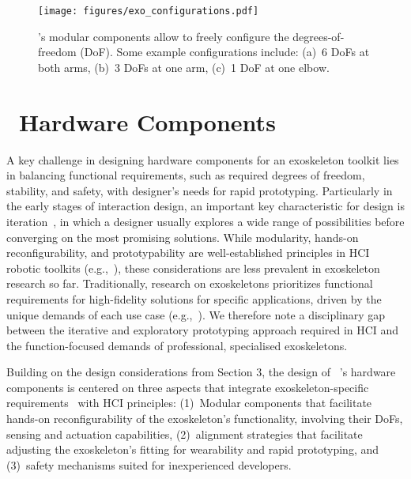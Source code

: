 \begin{figure*}[t]
    \centering
    \texttt{[image: figures/exo\_configurations.pdf]}
    \caption{\toolkit's modular components allow to freely configure the degrees-of-freedom (DoF). Some example configurations include: (a)~6 DoFs at both arms, (b)~3 DoFs at one arm, (c)~1 DoF at one elbow.}
    \label{fig:customizable_dof}
\end{figure*}
\section{\toolkit~Hardware Components}\label{sec:hardware}
A key challenge in designing hardware components for an exoskeleton toolkit lies in balancing functional requirements, such as required degrees of freedom, stability, and safety, with designer's needs for rapid prototyping. Particularly in the early stages of interaction design, an important key characteristic for design is iteration~\cite{preece_2015}, in which a designer usually explores a wide range of possibilities before converging on the most promising solutions. 
While modularity, hands-on reconfigurability, and prototypability are well-established principles in HCI robotic toolkits (e.g.,~\cite{cui_2023,cui_2024}), these considerations are less prevalent in exoskeleton research so far. Traditionally, research on exoskeletons prioritizes functional requirements for high-fidelity solutions for specific applications, driven by the unique demands of each use case (e.g.,~\cite{sarac_2019}). 
We therefore note a disciplinary gap between the iterative and exploratory prototyping approach required in HCI and the function-focused demands of professional, specialised exoskeletons.

Building on the design considerations from Section 3, the design of \toolkit~'s hardware components is centered on three aspects that integrate exoskeleton-specific requirements~\cite{souza_2016, sarac_2019} with HCI principles: (1)~Modular components that facilitate hands-on reconfigurability of the exoskeleton's functionality, involving their DoFs, sensing and actuation capabilities, (2)~alignment strategies that facilitate adjusting the exoskeleton's fitting for wearability and rapid prototyping, and (3)~safety mechanisms suited for inexperienced developers.

